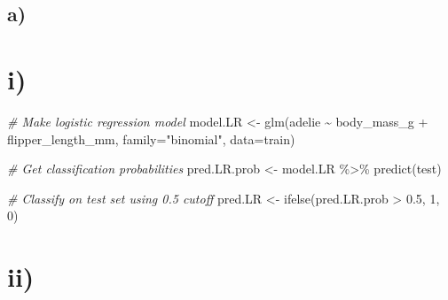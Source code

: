 \documentclass[
]{article}
\newenvironment{Shaded}{\begin{snugshade}}{\end{snugshade}}
\newcommand{\AttributeTok}[1]{\textcolor[rgb]{0.77,0.63,0.00}{#1}}
\newcommand{\CommentTok}[1]{\textcolor[rgb]{0.56,0.35,0.01}{\textit{#1}}}
\newcommand{\DecValTok}[1]{\textcolor[rgb]{0.00,0.00,0.81}{#1}}
\newcommand{\FloatTok}[1]{\textcolor[rgb]{0.00,0.00,0.81}{#1}}
\newcommand{\FunctionTok}[1]{\textcolor[rgb]{0.00,0.00,0.00}{#1}}
\newcommand{\NormalTok}[1]{#1}
\newcommand{\OtherTok}[1]{\textcolor[rgb]{0.56,0.35,0.01}{#1}}
\newcommand{\SpecialCharTok}[1]{\textcolor[rgb]{0.00,0.00,0.00}{#1}}
\newcommand{\StringTok}[1]{\textcolor[rgb]{0.31,0.60,0.02}{#1}}
\begin{document}
\hypertarget{a-2}{%
\subsection{a)}\label{a-2}}

\hypertarget{i}{%
\section{i)}\label{i}}

\begin{Shaded}
\begin{Highlighting}[]
\CommentTok{\# Make logistic regression model}
\NormalTok{model.LR }\OtherTok{\textless{}{-}} \FunctionTok{glm}\NormalTok{(adelie }\SpecialCharTok{\textasciitilde{}}\NormalTok{ body\_mass\_g }\SpecialCharTok{+}\NormalTok{ flipper\_length\_mm,}
                 \AttributeTok{family=}\StringTok{"binomial"}\NormalTok{,}
                 \AttributeTok{data=}\NormalTok{train)}

\CommentTok{\# Get classification probabilities}
\NormalTok{pred.LR.prob }\OtherTok{\textless{}{-}}\NormalTok{ model.LR }\SpecialCharTok{\%\textgreater{}\%} \FunctionTok{predict}\NormalTok{(test)}

\CommentTok{\# Classify on test set using 0.5 cutoff}
\NormalTok{pred.LR }\OtherTok{\textless{}{-}} \FunctionTok{ifelse}\NormalTok{(pred.LR.prob }\SpecialCharTok{\textgreater{}} \FloatTok{0.5}\NormalTok{, }\DecValTok{1}\NormalTok{, }\DecValTok{0}\NormalTok{)}
\end{Highlighting}
\end{Shaded}

\hypertarget{ii}{%
\section{ii)}\label{ii}}

\begin{Shaded}
\end{Shaded}
\end{document}
